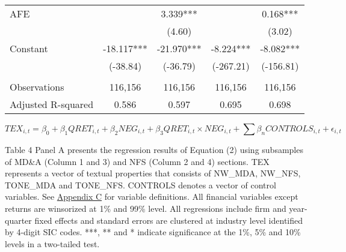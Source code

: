 \begin{table}[H]
\begin{center}
\begin{tabular}{lcccc}
			AFE &   & 3.339*** &   & 0.168*** \\
			&   & (4.60) &   & (3.02) \\
			Constant & -18.117*** & -21.970*** & -8.224*** & -8.082*** \\
			& (-38.84) & (-36.79) & (-267.21) & (-156.81) \\
			&   &   &   &  \\
			Observations & 116,156 & 116,156 & 116,156 & 116,156 \\
			Adjusted R-squared & 0.586 & 0.597 & 0.695 & 0.698 \\
			\bottomrule
			\bottomrule
		\end{tabular}%
	\end{center}
\begin{footnotesize}
	\setcounter{equation}{1}
	\begin{equation}
		TEX_{i,t}=\beta_0+\beta_1QRET_{i,t}+\beta_2NEG_{i,t}+\beta_3QRET_{i,t}\times NEG_{i,t}+\sum\beta_nCONTROLS_{i,t}+\epsilon_{i,t}
	\end{equation}
	
	\noindent Table 4 Panel A presents the regression results of Equation (2) using subsamples of MD\&A (Column 1 and 3) and NFS (Column 2 and 4) sections. TEX represents a vector of textual properties that consists of NW\_MDA, NW\_NFS, TONE\_MDA and TONE\_NFS. CONTROLS denotes a vector of control variables. See \hyperref[appc]{Appendix C} for variable definitions. All financial variables except returns are winsorized at 1\% and 99\% level. All regressions include firm and year-quarter fixed effects and standard errors are clustered at industry level identified by 4-digit SIC codes. ***, ** and * indicate significance at the 1\%, 5\% and 10\% levels in a two-tailed test.
\end{footnotesize}
\end{table}%